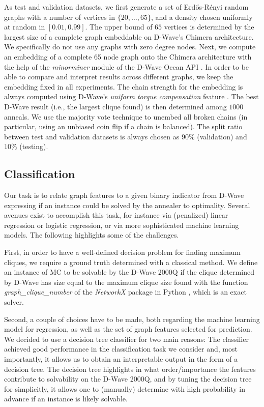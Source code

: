 \documentclass[a4paper,11pt]{article}
\begin{document}
As test and validation datasets, we first generate a set of Erd\H{o}s-R\'enyi random graphs with a number of vertices in $\{20,\ldots,65\}$, and a density chosen uniformly at random in $[0.01,0.99]$. The upper bound of $65$ vertices is determined by the largest size of a complete graph embeddable on D-Wave's Chimera architecture. We specifically do not use any graphs with zero degree nodes. Next, we compute an embedding of a complete 65 node graph onto the Chimera architecture with the help of the \textit{minorminer} module of the D-Wave Ocean API \cite{minorminer}. In order to be able to compare and interpret results across different graphs, we keep the embedding fixed in all experiments. The chain strength for the embedding is always computed using D-Wave's \textit{uniform torque compensation} feature \cite{dwave_torque}. The best D-Wave result (i.e., the largest clique found) is then determined among $1000$ anneals. We use the majority vote technique to unembed all broken chains (in particular, using an unbiased coin flip if a chain is balanced). The split ratio between test and validation datasets is always chosen as $90\%$ (validation) and $10\%$ (testing).

\subsection{Classification}
Our task is to relate graph features to a given binary indicator from D-Wave expressing if an instance could be solved by the annealer to optimality. Several avenues exist to accomplish this task, for instance via (penalized) linear regression or logistic regression, or via more sophisticated machine learning models. The following highlights some of the challenges.

First, in order to have a well-defined decision problem for finding maximum cliques, we require a ground truth determined with a classical method. We define an instance of MC to be solvable by the D-Wave 2000Q if the clique determined by D-Wave has size equal to the maximum clique size found with the function \textit{graph\_clique\_number} of the \textit{NetworkX} package in Python \cite{networkx, graphcliquenumber}, which is an exact solver.

Second, a couple of choices have to be made, both regarding the machine learning model for regression, as well as the set of graph features selected for prediction. We decided to use a decision tree classifier for two main reasons: The classifier achieved good performance in the classification task we consider and, most importantly, it allows us to obtain an interpretable output in the form of a decision tree. The decision tree highlights in what order/importance the features contribute to solvability on the D-Wave 2000Q, and by tuning the decision tree for simplicitly, it allows one to (manually) determine with high probability in advance if an instance is likely solvable.
\end{document}
